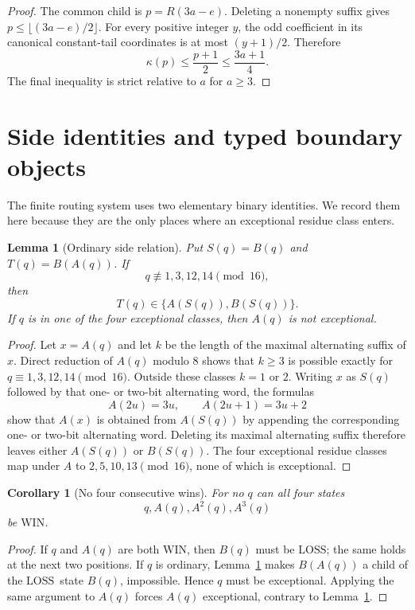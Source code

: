 \documentclass[11pt]{article}
\newtheorem{lemma}[theorem]{Lemma}
\newtheorem{corollary}[theorem]{Corollary}
\newcommand{\WIN}{\ensuremath{\mathrm{WIN}}}
\newcommand{\LOSS}{\ensuremath{\mathrm{LOSS}}}
\begin{document}
\begin{proof}
The common child is $p=R(3a-e)$. Deleting a nonempty suffix gives
$p\le\lfloor(3a-e)/2\rfloor$. For every positive integer $y$, the odd
coefficient in its canonical constant-tail coordinates is at most $(y+1)/2$.
Therefore
\[
 \kappa(p)\le\frac{p+1}{2}\le\frac{3a+1}{4}.
\]
The final inequality is strict relative to $a$ for $a\ge3$.
\end{proof}

\section{Side identities and typed boundary objects}

The finite routing system uses two elementary binary identities. We record
them here because they are the only places where an exceptional residue class
enters.

\begin{lemma}[Ordinary side relation]\label{lem:side}
Put $S(q)=B(q)$ and $T(q)=B(A(q))$. If
\[
  q\not\equiv1,3,12,14\pmod{16},
\]
then
\[
  T(q)\in\{A(S(q)),B(S(q))\}.
\]
If $q$ is in one of the four exceptional classes, then $A(q)$ is not
exceptional.
\end{lemma}

\begin{proof}
Let $x=A(q)$ and let $k$ be the length of the maximal alternating suffix of
$x$. Direct reduction of $A(q)$ modulo $8$ shows that $k\ge3$ is possible
exactly for $q\equiv1,3,12,14\pmod{16}$. Outside these classes $k=1$ or
$2$. Writing $x$ as $S(q)$ followed by that one- or two-bit alternating word,
the formulas
\[
  A(2u)=3u,\qquad A(2u+1)=3u+2
\]
show that $A(x)$ is obtained from $A(S(q))$ by appending the corresponding
one- or two-bit alternating word. Deleting its maximal alternating suffix
therefore leaves either $A(S(q))$ or $B(S(q))$. The four exceptional residue
classes map under $A$ to $2,5,10,13\pmod{16}$, none of which is exceptional.
\end{proof}

\begin{corollary}[No four consecutive wins]\label{cor:no-four-win}
For no $q$ can all four states
\[
  q,A(q),A^2(q),A^3(q)
\]
be \WIN.
\end{corollary}

\begin{proof}
If $q$ and $A(q)$ are both \WIN, then $B(q)$ must be \LOSS; the same holds at
the next two positions. If $q$ is ordinary, Lemma~\ref{lem:side} makes
$B(A(q))$ a child of the \LOSS\ state $B(q)$, impossible. Hence $q$ must be
exceptional. Applying the same argument to $A(q)$ forces $A(q)$ exceptional,
contrary to Lemma~\ref{lem:side}.
\end{proof}
\end{document}
